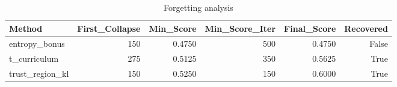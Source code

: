 \begin{table}[htbp]
\centering
\caption{Forgetting analysis}
\label{tab:forgetting}
\begin{tabular}{lrrrrr}
\toprule
\textbf{Method} & \textbf{First\_Collapse} & \textbf{Min\_Score} & \textbf{Min\_Score\_Iter} & \textbf{Final\_Score} & \textbf{Recovered} \\
\midrule
entropy\_bonus & 150 & 0.4750 & 500 & 0.4750 & False \\
t\_curriculum & 275 & 0.5125 & 350 & 0.5625 & True \\
trust\_region\_kl & 150 & 0.5250 & 150 & 0.6000 & True \\
\bottomrule
\end{tabular}
\end{table}